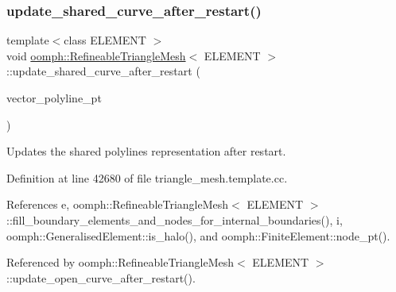 \subsubsection{\texorpdfstring{update\+\_\+shared\+\_\+curve\+\_\+after\+\_\+restart()}{update\_shared\_curve\_after\_restart()}}
{\footnotesize\ttfamily template$<$class E\+L\+E\+M\+E\+NT $>$ \\
void \hyperlink{classoomph_1_1RefineableTriangleMesh}{oomph\+::\+Refineable\+Triangle\+Mesh}$<$ E\+L\+E\+M\+E\+NT $>$\+::update\+\_\+shared\+\_\+curve\+\_\+after\+\_\+restart (\begin{DoxyParamCaption}\item[{\hyperlink{classoomph_1_1Vector}{Vector}$<$ \hyperlink{classoomph_1_1TriangleMeshPolyLine}{Triangle\+Mesh\+Poly\+Line} $\ast$$>$ \&}]{vector\+\_\+polyline\+\_\+pt }\end{DoxyParamCaption})\hspace{0.3cm}{\ttfamily [protected]}}



Updates the shared polylines representation after restart. 



Definition at line 42680 of file triangle\+\_\+mesh.\+template.\+cc.



References e, oomph\+::\+Refineable\+Triangle\+Mesh$<$ E\+L\+E\+M\+E\+N\+T $>$\+::fill\+\_\+boundary\+\_\+elements\+\_\+and\+\_\+nodes\+\_\+for\+\_\+internal\+\_\+boundaries(), i, oomph\+::\+Generalised\+Element\+::is\+\_\+halo(), and oomph\+::\+Finite\+Element\+::node\+\_\+pt().



Referenced by oomph\+::\+Refineable\+Triangle\+Mesh$<$ E\+L\+E\+M\+E\+N\+T $>$\+::update\+\_\+open\+\_\+curve\+\_\+after\+\_\+restart().

\mbox{\label{classoomph_1_1RefineableTriangleMesh_abf6df1f560c8559467673c45a5b26e2e}} 
